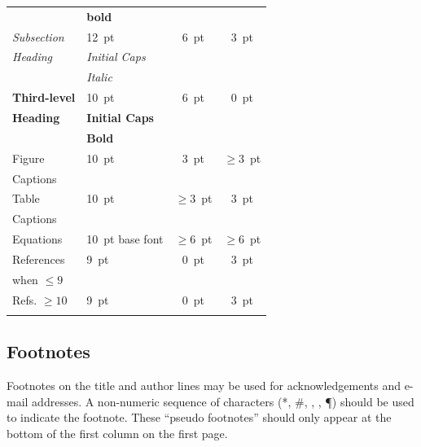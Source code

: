 \documentclass[a4paper,
               keeplastbox,   %
               ]{jacow}
\begin{document}
\begin{table}[h!b]
\begin{tabular}{llcc}
		& \textbf{bold}               &                 &      \\[5pt]
		\textit{Subsection} & \SI{12}{pt}                 & \SI{6}{pt}      & \SI{3}{pt}  \\
		\textit{Heading}
                             & \textit{Initial Caps}       &                 &      \\
		& \textit{Italic}             &                 &      \\[5pt]
		\textbf{Third-level} & \SI{10}{pt}                 & \SI{6}{pt}      & \SI{0}{pt}  \\
		\textbf{Heading}     
                            & \textbf{Initial Caps}       &                 &      \\
		& \textbf{Bold}               &                 &      \\[5pt]
		Figure        & \SI{10}{pt}                 & \SI{3}{pt}      & $\ge$\SI{3}{pt}  \\
		Captions      &                             &                 &      \\[5pt]
		Table         & \SI{10}{pt}                 & $\ge$\SI{3}{pt} & \SI{3}{pt}  \\
		Captions      &                             &                 &      \\[5pt]
		Equations     & \SI{10}{pt} base font       & $\ge$\SI{6}{pt}     & $\ge$\SI{6}{pt} \\[5pt]
		References      & \SI{9}{pt}				& \SI{0}{pt}      & \SI{3}{pt} \\
        when $\le9$ 	& \verb||	&                 &  \\[5pt]
        Refs. $\ge10$ 	& \SI{9}{pt}				& \SI{0}{pt}      & \SI{3}{pt}  \\
                		& \verb||	&    &    \\
		\bottomrule   %
	\end{tabular}
\end{table}

\subsection{Footnotes}

Footnotes on the title and author lines may be used for acknowledgements
and e-mail addresses. A non-numeric sequence of characters (*, \#,
\dag, \ddag, \P) should be used to indicate the footnote.
These “pseudo footnotes” should only
appear at the bottom of the first column on the first page.
\end{document}
